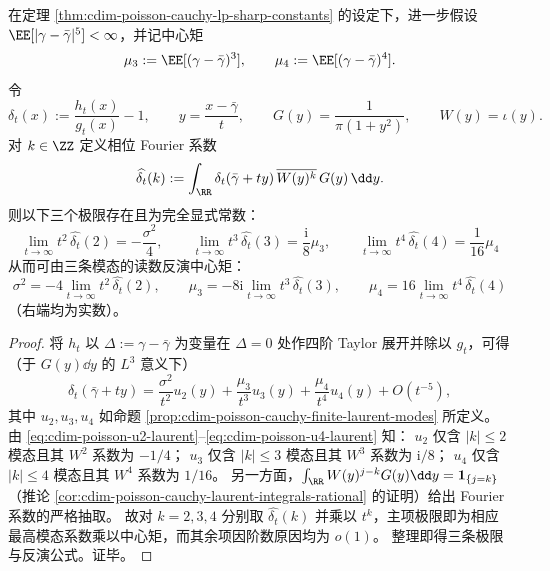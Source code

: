 \begin{proposition}\label{prop:cdim-poisson-cauchy-moment-inversion-by-phase-modes}
在定理 \ref{thm:cdim-poisson-cauchy-lp-sharp-constants} 的设定下，进一步假设 \(\EE[|\gamma-\bar\gamma|^5]<\infty\)，并记中心矩
\[
\mu_3:=\EE[(\gamma-\bar\gamma)^3],\qquad \mu_4:=\EE[(\gamma-\bar\gamma)^4].
\]
令
\[
\delta_t(x):=\frac{h_t(x)}{g_t(x)}-1,
\qquad
y=\frac{x-\bar\gamma}{t},
\qquad
G(y)=\frac{1}{\pi(1+y^2)},
\qquad
W(y)=\iota(y).
\]
对 \(k\in\ZZ\) 定义相位 Fourier 系数
\[
\widehat{\delta_t}(k):=\int_{\RR}\delta_t(\bar\gamma+t y)\,\overline{W(y)^k}\,G(y)\,\dd y.
\]
则以下三个极限存在且为完全显式常数：
\[
\boxed{\;
\lim_{t\to\infty}t^2\,\widehat{\delta_t}(2)=-\frac{\sigma^2}{4},\qquad
\lim_{t\to\infty}t^3\,\widehat{\delta_t}(3)=\frac{\mathrm{i}}{8}\mu_3,\qquad
\lim_{t\to\infty}t^4\,\widehat{\delta_t}(4)=\frac{1}{16}\mu_4\;}
\]
从而可由三条模态的读数反演中心矩：
\[
\boxed{\;
\sigma^2=-4\lim_{t\to\infty}t^2\,\widehat{\delta_t}(2),\qquad
\mu_3=-8\mathrm{i}\lim_{t\to\infty}t^3\,\widehat{\delta_t}(3),\qquad
\mu_4=16\lim_{t\to\infty}t^4\,\widehat{\delta_t}(4)\;}
\]
（右端均为实数）。
\end{proposition}
\begin{proof}
将 \(h_t\) 以 \(\Delta:=\gamma-\bar\gamma\) 为变量在 \(\Delta=0\) 处作四阶 Taylor 展开并除以 \(g_t\)，可得（于 \(G(y)\dd y\) 的 \(L^3\) 意义下）
\[
\delta_t(\bar\gamma+t y)
=\frac{\sigma^2}{t^2}u_2(y)+\frac{\mu_3}{t^3}u_3(y)+\frac{\mu_4}{t^4}u_4(y)+O(t^{-5}),
\]
其中 \(u_2,u_3,u_4\) 如命题 \ref{prop:cdim-poisson-cauchy-finite-laurent-modes} 所定义。
由 \eqref{eq:cdim-poisson-u2-laurent}--\eqref{eq:cdim-poisson-u4-laurent} 知：
\(
u_2
\)
仅含 \(|k|\le 2\) 模态且其 \(W^2\) 系数为 \(-1/4\)；
\(
u_3
\)
仅含 \(|k|\le 3\) 模态且其 \(W^3\) 系数为 \(\mathrm{i}/8\)；
\(
u_4
\)
仅含 \(|k|\le 4\) 模态且其 \(W^4\) 系数为 \(1/16\)。
另一方面，\(\int_{\RR}W(y)^{j-k}G(y)\dd y=\mathbf 1_{\{j=k\}}\)（推论 \ref{cor:cdim-poisson-cauchy-laurent-integrals-rational} 的证明）给出 Fourier 系数的严格抽取。
故对 \(k=2,3,4\) 分别取 \(\widehat{\delta_t}(k)\) 并乘以 \(t^k\)，主项极限即为相应最高模态系数乘以中心矩，而其余项因阶数原因均为 \(o(1)\)。
整理即得三条极限与反演公式。证毕。
\end{proof}

\endinput

